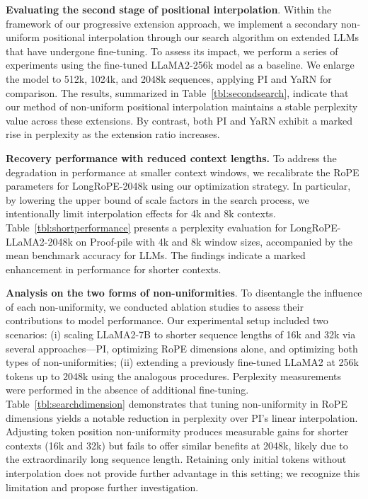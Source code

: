 \textbf{Evaluating the second stage of positional interpolation}. Within the framework of our progressive extension approach, we implement a secondary non-uniform positional interpolation through our search algorithm on extended LLMs that have undergone fine-tuning. To assess its impact, we perform a series of experiments using the fine-tuned LLaMA2-256k model as a baseline. We enlarge the model to 512k, 1024k, and 2048k sequences, applying PI and YaRN for comparison. The results, summarized in Table~\ref{tbl:secondsearch}, indicate that our method of non-uniform positional interpolation maintains a stable perplexity value across these extensions. By contrast, both PI and YaRN exhibit a marked rise in perplexity as the extension ratio increases.

\textbf{Recovery performance with reduced context lengths.} To address the degradation in performance at smaller context windows, we recalibrate the RoPE parameters for LongRoPE-2048k using our optimization strategy. In particular, by lowering the upper bound of scale factors in the search process, we intentionally limit interpolation effects for 4k and 8k contexts. Table~\ref{tbl:shortperformance} presents a perplexity evaluation for LongRoPE-LLaMA2-2048k on Proof-pile with 4k and 8k window sizes, accompanied by the mean benchmark accuracy for LLMs. The findings indicate a marked enhancement in performance for shorter contexts.

\textbf{Analysis on the two forms of non-uniformities}. To disentangle the influence of each non-uniformity, we conducted ablation studies to assess their contributions to model performance. Our experimental setup included two scenarios: (i) scaling LLaMA2-7B to shorter sequence lengths of 16k and 32k via several approaches—PI, optimizing RoPE dimensions alone, and optimizing both types of non-uniformities; (ii) extending a previously fine-tuned LLaMA2 at 256k tokens up to 2048k using the analogous procedures. Perplexity measurements were performed in the absence of additional fine-tuning. Table~\ref{tbl:searchdimension} demonstrates that tuning non-uniformity in RoPE dimensions yields a notable reduction in perplexity over PI’s linear interpolation. Adjusting token position non-uniformity produces measurable gains for shorter contexts (16k and 32k) but fails to offer similar benefits at 2048k, likely due to the extraordinarily long sequence length. Retaining only initial tokens without interpolation does not provide further advantage in this setting; we recognize this limitation and propose further investigation.

